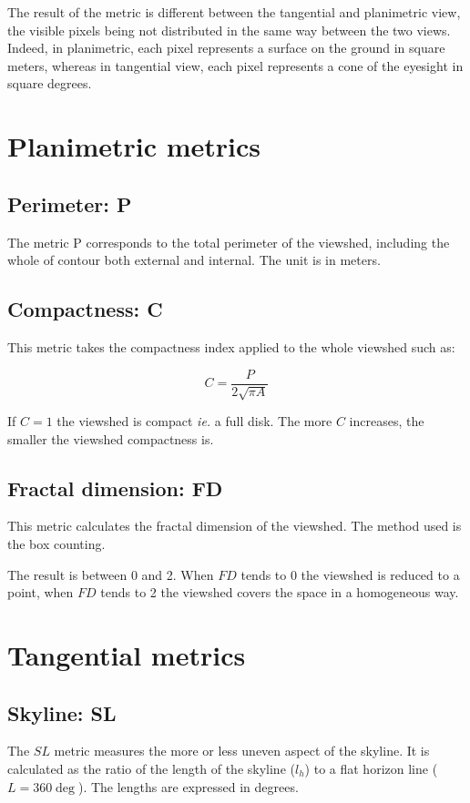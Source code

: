 \documentclass{report}
\begin{document}
The result of the metric is different between the tangential and planimetric view, the visible pixels being not distributed in the same way between the two views. Indeed, in planimetric, each pixel represents a surface on the ground in square meters, whereas in tangential view, each pixel represents a cone of the eyesight in square degrees.


\section{Planimetric metrics}

\subsection{Perimeter: P}

The metric P corresponds to the total perimeter of the viewshed, including the whole of contour both external and internal. The unit is in meters.


\subsection{Compactness: C}
This metric takes the compactness index applied to the whole viewshed such as:

$$C=\frac{P}{2\sqrt{\pi A}}$$

If $C=1$ the viewshed is compact \textit{ie.} a full disk. The more $C$ increases, the smaller the viewshed compactness is.


\subsection{Fractal dimension: FD}
This metric calculates the fractal dimension of the viewshed. The method used is the box counting.

The result is between 0 and 2. When $FD$ tends to 0 the viewshed is reduced to a point, when $FD$ tends to 2 the viewshed covers the space in a homogeneous way.

\section{Tangential metrics}

\subsection{Skyline: SL}

The $SL$ metric measures the more or less uneven aspect of the skyline. It is calculated as the ratio of the length of the skyline ($l_h$) to a flat horizon line ($L = 360\deg$). The lengths are expressed in degrees.
\end{document}
